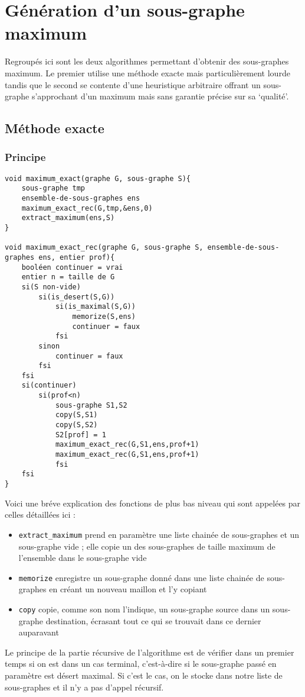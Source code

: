 \section{Génération d'un sous-graphe maximum}

Regroupés ici sont les deux algorithmes permettant d'obtenir des sous-graphes maximum. Le premier utilise une méthode exacte mais particulièrement lourde tandis que le second se contente d'une heuristique arbitraire offrant un sous-graphe s'approchant d'un maximum mais sans garantie précise sur sa `qualité'.

\subsection{Méthode exacte}

\subsubsection{Principe}

\begin{verbatim}
void maximum_exact(graphe G, sous-graphe S){
    sous-graphe tmp
    ensemble-de-sous-graphes ens
    maximum_exact_rec(G,tmp,&ens,0)
    extract_maximum(ens,S)
}

void maximum_exact_rec(graphe G, sous-graphe S, ensemble-de-sous-graphes ens, entier prof){
    booléen continuer = vrai
    entier n = taille de G
    si(S non-vide)
        si(is_desert(S,G))
            si(is_maximal(S,G))
                memorize(S,ens)
                continuer = faux
            fsi
        sinon
            continuer = faux
        fsi
    fsi
    si(continuer)
        si(prof<n)
            sous-graphe S1,S2
            copy(S,S1)
            copy(S,S2)
            S2[prof] = 1
            maximum_exact_rec(G,S1,ens,prof+1)
            maximum_exact_rec(G,S1,ens,prof+1)
		    fsi
    fsi
}
\end{verbatim}

Voici une bréve explication des fonctions de plus bas niveau qui sont appelées par celles détaillées ici : 
\begin{itemize}
	\item{\verb|extract_maximum|} prend en paramètre une liste chainée de sous-graphes et un sous-graphe vide ; elle copie un des sous-graphes de taille maximum de l'ensemble dans le sous-graphe vide
	\item{\verb|memorize|} enregistre un sous-graphe donné dans une liste chainée de sous-graphes en créant un nouveau maillon et l'y copiant
	\item{\verb|copy|} copie, comme son nom l'indique, un sous-graphe source dans un sous-graphe destination, écrasant tout ce qui se trouvait dans ce dernier auparavant
\end{itemize}
Le principe de la partie récursive de l'algorithme est de vérifier dans un premier temps si on est dans un cas terminal, c'est-à-dire si le sous-graphe passé en paramètre est désert maximal. Si c'est le cas, on le stocke dans notre liste de sous-graphes et il n'y a pas d'appel récursif.


